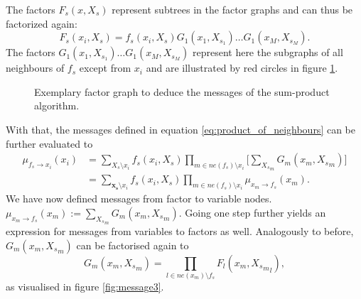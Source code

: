 \documentclass{sigkdd}
\begin{document}
The factors $F_s(x,X_s)$ represent subtrees in the factor graphs and can thus be factorized again: 
\begin{equation}\label{eq:product_of_neighbours}
F_s(x_i,X_s) = f_s(x_i, X_s) G_1(x_1, X_{s_1})\dots G_1(x_M, X_{s_M}).
\end{equation}
The factors $G_1(x_1, X_{s_1})\dots G_1(x_M, X_{s_M})$ represent here the subgraphs of all neighbours of $f_s$ except from $x_i$ and are illustrated by red circles in figure \ref{fig:message2}.

\begin{figure}[h]
	\centering
	\caption{Exemplary factor graph to deduce the messages of the sum-product algorithm.}\label{fig:message2}
\end{figure}

With that, the messages defined in equation \ref{eq:product_of_neighbours} can be further evaluated to
\begin{equation}\label{eq:message2}
\begin{split}
\mu_{f_s \rightarrow x_i}(x_i) &= \sum_{X_s \setminus x_i} f_s(x_i, X_s) \prod_{m \in ne(f_s) \setminus x_i} \Big[ \sum_{{X_s}_m} G_m(x_m, {X_s}_m)  \Big] \\ &= \sum_{\mathbf{x_s} \setminus x_i} f_s(x_i, X_s) \prod_{m \in ne(f_s) \setminus x_i} \mu_{x_m \rightarrow f_s}(x_m).
\end{split}
\end{equation}
We have now defined  messages from factor to variable nodes. $\mu_{x_m \rightarrow f_s}(x_m) :=\sum_{{X_s}_m} G_m(x_m, {X_s}_m)$. Going one step further yields an expression for messages from variables to factors as well. Analogously to before, $G_m(x_m, {X_s}_m)$ can be factorised again to 
\begin{equation}\label{eq:product_of_neighbours2}
G_m(x_m,{X_s}_m) = \prod_{l \in ne(x_m) \setminus f_s} F_l(x_m, {{X_s}_m}_l),
\end{equation}
as visualised in figure \ref{fig:message3}.
\end{document}
